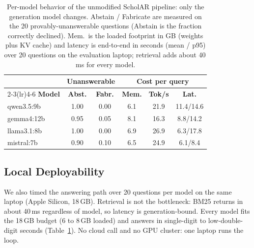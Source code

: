 \documentclass[11pt,letterpaper]{article}
\begin{document}
\begin{table}[t]
  \centering
  \caption{Per-model behavior of the unmodified ScholAR pipeline: only the generation model
           changes. Abstain / Fabricate are measured on the 20 provably-unanswerable questions
           (Abstain is the fraction correctly declined). Mem.\ is the loaded footprint in GB
           (weights plus KV cache) and latency is end-to-end in seconds (mean / p95) over 20
           questions on the evaluation laptop; retrieval adds about 40\,ms for every model.}
  \label{tab:permodel}
  \setlength{\tabcolsep}{3pt}
  \begin{tabular}{lccccc}
    \toprule
    & \multicolumn{2}{c}{\textbf{Unanswerable}} & \multicolumn{3}{c}{\textbf{Cost per query}} \\
    \cmidrule(lr){2-3}\cmidrule(lr){4-6}
    \textbf{Model} & \textbf{Abst.} & \textbf{Fabr.} & \textbf{Mem.} & \textbf{Tok/s} & \textbf{Lat.} \\
    \midrule
    qwen3.5:9b   & 1.00 & 0.00 & 6.1 & 21.9 & 11.4/14.6 \\
    gemma4:12b   & 0.95 & 0.05 & 8.1 & 16.3 & 8.8/14.2 \\
    llama3.1:8b  & 1.00 & 0.00 & 6.9 & 26.9 & 6.3/17.8 \\
    mistral:7b   & 0.90 & 0.10 & 6.5 & 24.9 & 6.1/8.4 \\
    \bottomrule
  \end{tabular}
\end{table}


\subsection{Local Deployability}
\label{sec:efficiency}
We also timed the answering path over 20 questions per model on the same laptop (Apple Silicon,
18\,GB). Retrieval is not the bottleneck: BM25 returns in about 40\,ms regardless of model, so
latency is generation-bound. Every model fits the 18\,GB budget (6 to 8\,GB loaded) and answers
in single-digit to low-double-digit seconds (Table~\ref{tab:permodel}). No cloud call and no GPU
cluster: one laptop runs the loop.

\end{document}
